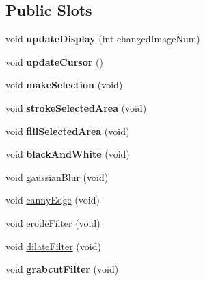\subsection*{Public Slots}
\begin{DoxyCompactItemize}
\item 
\hypertarget{class_scribble_area_a331b4c8f2b811671e140f75dc31a2c39}{void {\bfseries update\-Display} (int changed\-Image\-Num)}\label{class_scribble_area_a331b4c8f2b811671e140f75dc31a2c39}

\item 
\hypertarget{class_scribble_area_a07899960089b06f36d40ddcbf087d18f}{void {\bfseries update\-Cursor} ()}\label{class_scribble_area_a07899960089b06f36d40ddcbf087d18f}

\item 
\hypertarget{class_scribble_area_a1df2c552892d9d8c3e5e5f04f33f5610}{void {\bfseries make\-Selection} (void)}\label{class_scribble_area_a1df2c552892d9d8c3e5e5f04f33f5610}

\item 
\hypertarget{class_scribble_area_ab368bb43f8377a0bc022517b7238f677}{void {\bfseries stroke\-Selected\-Area} (void)}\label{class_scribble_area_ab368bb43f8377a0bc022517b7238f677}

\item 
\hypertarget{class_scribble_area_aaf30782668dfa40aea56062a31f84826}{void {\bfseries fill\-Selected\-Area} (void)}\label{class_scribble_area_aaf30782668dfa40aea56062a31f84826}

\item 
\hypertarget{class_scribble_area_a0c33d7376960578c2cc39d9bfb153ad2}{void {\bfseries black\-And\-White} (void)}\label{class_scribble_area_a0c33d7376960578c2cc39d9bfb153ad2}

\item 
void \hyperlink{class_scribble_area_a5b5545e0f7fbc6b6ee901fac13830a6e}{gaussian\-Blur} (void)
\item 
void \hyperlink{class_scribble_area_aff9034e3ddaae1296a3aab8fdb30fd30}{canny\-Edge} (void)
\item 
void \hyperlink{class_scribble_area_ad413c39ee40eb142f80dcb283d29c86a}{erode\-Filter} (void)
\item 
void \hyperlink{class_scribble_area_a77ea883ff6313a019d53b42a1254adad}{dilate\-Filter} (void)
\item 
\hypertarget{class_scribble_area_ab132e409c1e8932133c914413d498453}{void {\bfseries grabcut\-Filter} (void)}\label{class_scribble_area_ab132e409c1e8932133c914413d498453}

\end{DoxyCompactItemize}
